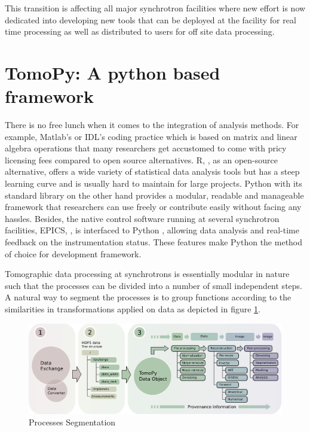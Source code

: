 \documentclass[pdf]{iucr}              %
\begin{document}
This transition is affecting all major synchrotron facilities where new effort is now dedicated into developing new tools that can be deployed at the facility for real time processing as well as distributed to users for off site data processing.


\section{TomoPy: A python based framework}

There is no free lunch when it comes to the integration of analysis methods. For example, Matlab's or IDL's coding practice which is based on matrix and linear algebra operations that many researchers get accustomed to come with pricy licensing fees compared to open source alternatives. R, \cite{r}, as an open-source alternative, offers a wide variety of statistical data analysis tools but has a steep learning curve and is usually hard to maintain for large projects. Python with its standard library on the other hand provides a modular, readable and manageable framework that researchers can use freely or contribute easily without facing any hassles. Besides, the native  control software running at several synchrotron facilities, EPICS, \cite{epics}, is interfaced to Python \cite{pyepics}, allowing data analysis and real-time feedback on the instrumentation status. These features make Python the method of choice for development framework.

Tomographic data processing at synchrotrons is essentially modular in nature such that the processes can be divided into a number of small independent steps. A natural way to segment the processes is to group functions according to the similarities in transformations applied on data as depicted in figure \ref{fig:ProcessSegmentation}. 


\onecolumn
\begin{figure}
\centering
\includegraphics[width=\textwidth]{fig_framework.eps}
\caption{Processes Segmentation}
\label{fig:ProcessSegmentation}
\end{figure}
\twocolumn
\end{document}
